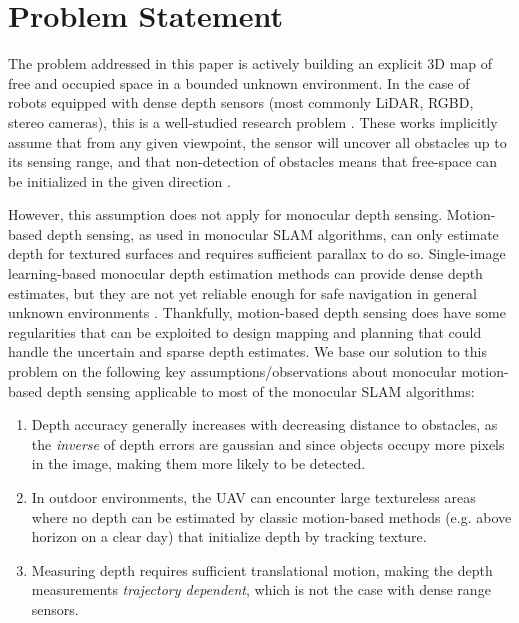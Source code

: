 \documentclass[letterpaper, 10 pt, journal, twoside]{IEEEtran}
\begin{document}
\section{Problem Statement}
{
The problem addressed in this paper is actively building an explicit 3D map of free and occupied space in a bounded unknown environment.
In the case of robots equipped with dense depth sensors (most commonly LiDAR, RGBD, stereo cameras), this is a well-studied research problem \cite{darpa_cerberus_wins, beneath, paper_frontier_grandpa}.
These works implicitly assume that from any given viewpoint, the sensor will uncover all obstacles up to its sensing range, and that non-detection of obstacles means that free-space can be initialized in the given direction  \cite{occupancy_moravec, octomap, voxblox, ufomap}.

However, this assumption does not apply for monocular depth sensing.
Motion-based depth sensing, as used in monocular SLAM algorithms, can only estimate depth for textured surfaces and requires sufficient parallax to do so.
Single-image learning-based monocular depth estimation methods \cite{deep_mono_depth_2021, monodepth_survey_big_2024} can provide dense depth estimates, but they are not yet reliable enough for safe navigation in general unknown environments \cite{simon2023mononav, mono_airsim_nav_2025}.
Thankfully, motion-based depth sensing does have some regularities that can be exploited to design mapping and planning that could handle the uncertain and sparse depth estimates.
We base our solution to this problem on the following key assumptions/observations about monocular motion-based depth sensing applicable to most of the monocular SLAM algorithms:
\begin{enumerate}
  \item {Depth accuracy generally increases with decreasing distance to obstacles}, as the \textit{inverse} of depth errors are gaussian \cite{inverse_depth} and since objects occupy more pixels in the image, making them more likely to be detected.
  \item In outdoor environments, {the UAV can encounter large textureless areas where no depth can be estimated by classic motion-based methods} (e.g. above horizon on a clear day) that initialize depth by tracking texture.
  \item {Measuring depth requires sufficient translational motion}, making the depth measurements \textit{trajectory dependent}, which is not the case with dense range sensors.
\end{enumerate}
}
\end{document}
